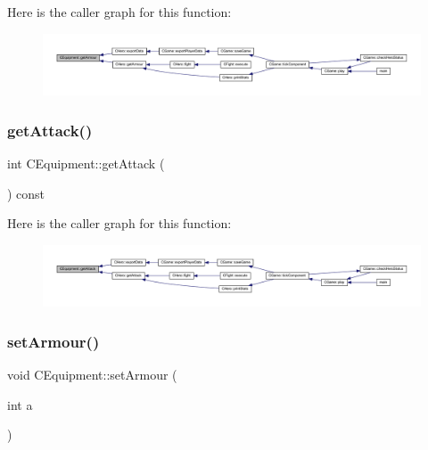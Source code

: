 Here is the caller graph for this function\+:\nopagebreak
\begin{figure}[H]
\begin{center}
\leavevmode
\includegraphics[width=350pt]{class_c_equipment_a27e962aead56bb39886acc86c17b7478_icgraph}
\end{center}
\end{figure}
\mbox{\label{class_c_equipment_a6b27732ece0ab3c74bff006093dc5a7d}} 
\subsubsection{\texorpdfstring{get\+Attack()}{getAttack()}}
{\footnotesize\ttfamily int C\+Equipment\+::get\+Attack (\begin{DoxyParamCaption}{ }\end{DoxyParamCaption}) const\hspace{0.3cm}{\ttfamily [inline]}}

Here is the caller graph for this function\+:\nopagebreak
\begin{figure}[H]
\begin{center}
\leavevmode
\includegraphics[width=350pt]{class_c_equipment_a6b27732ece0ab3c74bff006093dc5a7d_icgraph}
\end{center}
\end{figure}
\mbox{\label{class_c_equipment_a223e0e1172975f9d9c49612b2513afb0}} 
\subsubsection{\texorpdfstring{set\+Armour()}{setArmour()}}
{\footnotesize\ttfamily void C\+Equipment\+::set\+Armour (\begin{DoxyParamCaption}\item[{int}]{a }\end{DoxyParamCaption})\hspace{0.3cm}{\ttfamily [inline]}}

